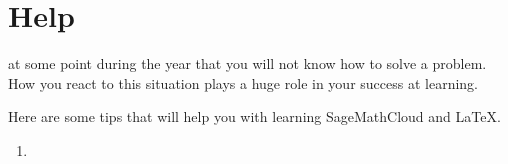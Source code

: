 \documentclass
[justified,nohyper]
{tufte-handout}
\begin{document}
\section{Help}

 at some point during the year that you will not know how to solve a problem. How you react to this situation plays a huge role in your success at learning.

Here are some tips that will help you with learning SageMathCloud and \LaTeX.

\begin{enumerate}
  \item 
\end{enumerate}
\end{document}
